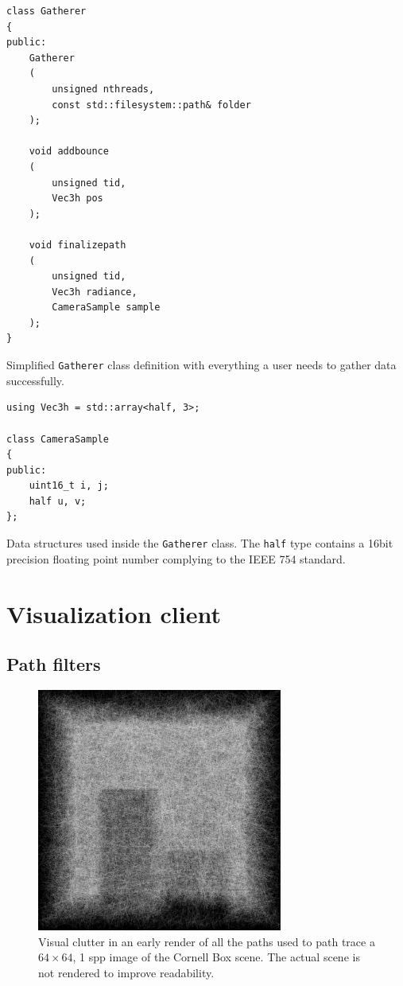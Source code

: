 \begin{Listing}
	\begin{lstlisting}
class Gatherer
{
public:
	Gatherer
	(
		unsigned nthreads, 
		const std::filesystem::path& folder
	);

	void addbounce
	(
		unsigned tid, 
		Vec3h pos
	);

	void finalizepath
	(
		unsigned tid, 
		Vec3h radiance, 
		CameraSample sample
	);
}
	\end{lstlisting}
	\caption{Simplified \texttt{Gatherer} class definition with everything a user needs to gather data successfully.}
	\label{gatherer_signatures}
\end{Listing}

\begin{Listing}
	\begin{lstlisting}
using Vec3h = std::array<half, 3>;

class CameraSample
{
public:
	uint16_t i, j;
	half u, v;
};
	\end{lstlisting}
	\caption{Data structures used inside the \texttt{Gatherer} class. The \texttt{half} type contains a 16bit precision floating point number complying to the IEEE 754 standard.}
	\label{gatherer_datastructures}
\end{Listing}


\section{Visualization client}

\subsection{Path filters}
\label{path_filters}
\begin{figure}
	\centering
	\includegraphics[height=8cm]{chapters/chapter_thetool/clutter_early.pdf}
	\caption{Visual clutter in an early render of all the paths used to path trace a $64 \times 64$, 1 spp image of the Cornell Box scene. The actual scene is not rendered to improve readability.}
	\label{visual_clutter}
\end{figure}


